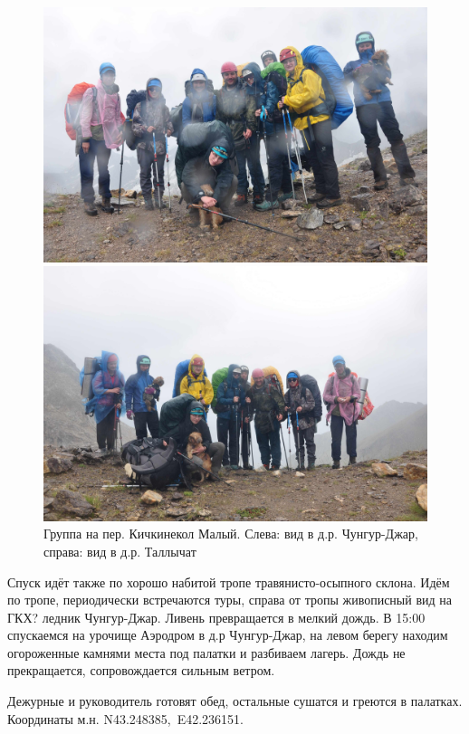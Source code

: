 \begin{figure}[h!]
	\centering
	\begin{minipage}[h]{0.48\linewidth}
		\includegraphics[width=0.99\linewidth]{../pics/DSC_0239.jpg}
	\end{minipage}
	\quad
	\begin{minipage}[h]{0.48\linewidth}
		\includegraphics[width=0.99\linewidth]{../pics/DSC_0242.jpg}
	\end{minipage}
	\caption{Группа на пер. Кичкинекол Малый. Слева: вид в д.р. Чунгур-Джар, справа: вид в д.р. Таллычат}
	\label{fig:DSC_0239}
\end{figure}

Спуск идёт также по хорошо набитой тропе травянисто-осыпного склона. Идём по тропе, периодически встречаются туры, справа от тропы живописный вид на ГКХ? ледник Чунгур-Джар. Ливень превращается в мелкий дождь. В 15:00 спускаемся на урочище Аэродром в д.р Чунгур-Джар, на левом берегу находим огороженные камнями места под палатки и разбиваем лагерь. Дождь не прекращается, сопровождается сильным ветром.

Дежурные и руководитель готовят обед, остальные сушатся и греются в палатках. Координаты м.н. N43.248385\degree,~E42.236151\degree.


\clearpage